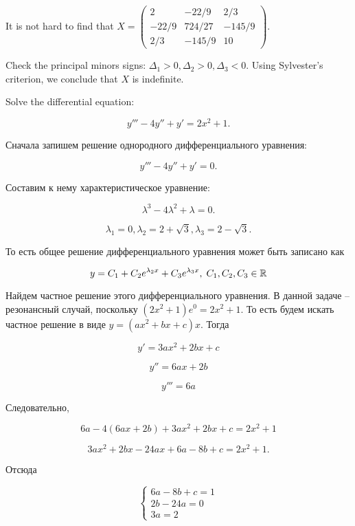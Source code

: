 \documentclass[addpoints, answers]{exam} %
\begin{document}
\begin{questions}
\begin{parts}
\begin{solution}

It is not hard to find that $X = \begin{pmatrix}
2 & -22/9 & 2/3 \\
-22/9 & 724/27 & -145/9\\
2/3 & -145/9 & 10
\end{pmatrix}
$.


Check the principal minors signs: $\Delta_1 > 0, \Delta_2 > 0, \Delta_3 < 0$.
Using Sylvester's criterion, we conclude that $X$ is indefinite.

\end{solution}

\end{parts}


\question[10] Solve the  differential equation:

\[
y''' -4y'' +y' =2x^{2} +1.
\]

\begin{solution}
Сначала запишем решение однородного дифференциального уравнения:

\[y''' -4y'' +y' =0.\]

Составим к нему характеристическое уравнение:

  \[\lambda ^{3} -4\lambda ^{2} +\lambda =0.\]

  \[\lambda _{1} =0,\lambda _{2} =2 + \sqrt{3},\lambda _{3} =2 - \sqrt{3}.\]

  То есть общее решение дифференциального уравнения может быть записано как

  \[y=C_{1} +C_{2} e^{\lambda_2 x} +C_{3} e^{\lambda_3 x},\; C_{1} ,C_{2} ,C_{3} \in \mathbb R \]

  Найдем частное решение этого дифференциального уравнения. В данной задаче -- резонансный случай, поскольку $\left(2x^{2} +1\right)e^{0} =2x^{2} +1$. То есть будем искать частное решение в виде $y=(ax^{2} +bx+c)x$. Тогда

  \[y' =3ax^{2} +2bx+c\]

  \[y'' =6ax+2b\]

  \[y''' =6a\]

  Следовательно,

  \[6a-4(6ax+2b)+3ax^{2} +2bx+c=2x^{2} +1\]

  \[3ax^{2} +2bx-24ax+6a-8b+c=2x^{2} +1.\]

  Отсюда

  \[\left\{\begin{array}{l} {6a-8b+c=1} \\ {2b-24a=0} \\ {3a=2} \end{array}\right. \]


\end{solution}
\end{questions}
\end{document}
